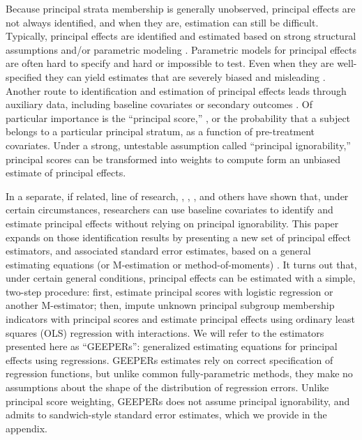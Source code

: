 \documentclass{statsoc} %
\begin{document}
Because principal strata membership is generally unobserved, principal effects are not always identified, and when they are, estimation can still be difficult.
Typically, principal effects are identified and estimated based on strong structural assumptions \citep[e.g.][]{air} and/or parametric modeling \citep[e.g.][]{imbens1997bayesian}.
Parametric models for principal effects are often hard to specify and hard or impossible to test.
Even when they are well-specified they can yield estimates that are severely biased and misleading \citep{griffin2008application,feller2016principal}.
Another route to identification and estimation of principal effects leads through auxiliary data, including baseline covariates or secondary outcomes \citep{mattei2013exploiting}.
Of particular importance is the ``principal score,'' \citep{jo,dingLu,feller2017principal}, or the probability that a subject belongs to a particular principal stratum, as a function of pre-treatment covariates.
Under a strong, untestable assumption called ``principal ignorability,''  principal scores can be transformed into weights to compute form an unbiased estimate of principal effects.

In a separate, if related, line of research, \citet{jo2002}, \citet{ding2011}, \citet{jiangDing2021}, and others have shown that, under certain circumstances, researchers can use baseline covariates to identify and estimate principal effects without relying on principal ignorability.
This paper expands on those identification results by presenting a new set of principal effect estimators, and associated standard error estimates, based on a general estimating equations (or M-estimation or method-of-moments) \citep{stefanskiBoos}.
It turns out that, under certain general conditions, principal effects can be estimated with a simple, two-step procedure: first, estimate principal scores with logistic regression or another M-estimator; then, impute unknown principal subgroup membership indicators with principal scores and estimate principal effects using ordinary least squares (OLS) regression with interactions. %
We will refer to the estimators presented here as ``GEEPERs'': generalized estimating equations for principal effects using regressions.
GEEPERs estimates rely on correct specification of regression functions, but unlike common fully-parametric methods, they make no assumptions about the shape of the distribution of regression errors.
Unlike principal score weighting, GEEPERs does not assume principal ignorability, and admits to sandwich-style standard error estimates, which we provide in the appendix.
\end{document}
